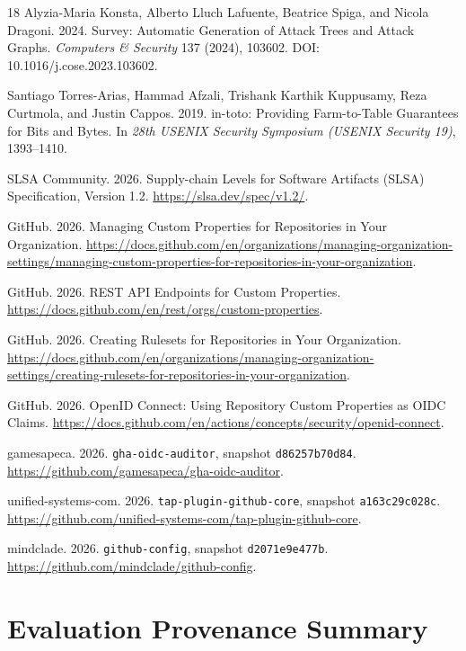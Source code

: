 \documentclass[sigconf,review,anonymous]{acmart}
\begin{document}
\begin{thebibliography}{18}
Alyzia-Maria Konsta, Alberto Lluch Lafuente, Beatrice Spiga, and Nicola Dragoni.
2024. Survey: Automatic Generation of Attack Trees and Attack Graphs.
\emph{Computers \& Security} 137 (2024), 103602.
DOI: 10.1016/j.cose.2023.103602.

Santiago Torres-Arias, Hammad Afzali, Trishank Karthik Kuppusamy, Reza Curtmola,
and Justin Cappos. 2019. in-toto: Providing Farm-to-Table Guarantees for Bits
and Bytes. In \emph{28th USENIX Security Symposium (USENIX Security 19)}, 1393--1410.

SLSA Community. 2026. Supply-chain Levels for Software Artifacts (SLSA)
Specification, Version 1.2. \url{https://slsa.dev/spec/v1.2/}.

GitHub. 2026. Managing Custom Properties for Repositories in Your Organization.
\url{https://docs.github.com/en/organizations/managing-organization-settings/managing-custom-properties-for-repositories-in-your-organization}.

GitHub. 2026. REST API Endpoints for Custom Properties.
\url{https://docs.github.com/en/rest/orgs/custom-properties}.

GitHub. 2026. Creating Rulesets for Repositories in Your Organization.
\url{https://docs.github.com/en/organizations/managing-organization-settings/creating-rulesets-for-repositories-in-your-organization}.

GitHub. 2026. OpenID Connect: Using Repository Custom Properties as OIDC Claims.
\url{https://docs.github.com/en/actions/concepts/security/openid-connect}.

gamesapeca. 2026. \nolinkurl{gha-oidc-auditor}, snapshot
\nolinkurl{d86257b70d84}.
\url{https://github.com/gamesapeca/gha-oidc-auditor}.

unified-systems-com. 2026. \nolinkurl{tap-plugin-github-core}, snapshot
\nolinkurl{a163c29c028c}.
\url{https://github.com/unified-systems-com/tap-plugin-github-core}.

mindclade. 2026. \nolinkurl{github-config}, snapshot
\nolinkurl{d2071e9e477b}.
\url{https://github.com/mindclade/github-config}.

\end{thebibliography}

\clearpage
\appendix
\section{Evaluation Provenance Summary}
\end{document}
